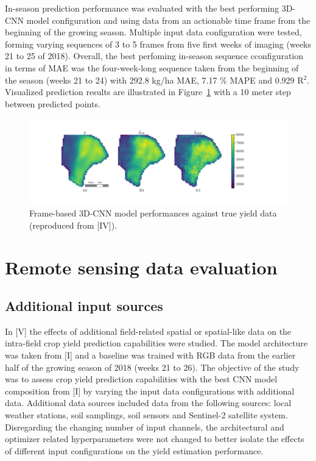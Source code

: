 In-season prediction performance was evaluated with the best performing 3D-CNN model configuration and using data from an actionable time frame from the beginning of the growing season. Multiple input data configuration were tested, forming varying sequences of 3 to 5 frames from five first weeks of imaging (weeks 21 to 25 of 2018). Overall, the best perfoming in-season sequence cconfiguration in terms of MAE was the four-week-long sequence taken from the beginning of the season (weeks 21 to 24) with 292.8 kg/ha MAE, 7.17 \% MAPE and 0.929 R$^2$. Visualized prediction results are illustrated in Figure~\ref{fig:iv-true-pred} with a 10 meter step between predicted points. 

\begin{figure}[htb]
    \centering
    \includegraphics[width = \textwidth]{Images/iv-true_pred.png}
    \caption{Frame-based 3D-CNN model performances against true yield data (reproduced from [IV]).}
    \label{fig:iv-true-pred}
\end{figure}

\section{Remote sensing data evaluation}
\label{sec:input-assessment-results}


\subsection{Additional input sources}
\label{subsec:additional-inputs-results}

In [V] the effects of additional field-related spatial or spatial-like data on the intra-field crop yield prediction capabilities were studied. The model architecture was taken from [I] and a baseline was trained with RGB data from the earlier half of the growing season of 2018 (weeks 21 to 26). The objective of the study was to assess crop yield prediction capabilities with the best CNN model composition from [I] by varying the input data configurations with additional data. Additional data sources included data from the following sources: local weather stations, soil samplings, soil sensors and Sentinel-2 satellite system. Disregarding the changing number of input channels, the architectural and optimizer related hyperparameters were not changed to better isolate the effects of different input configurations on the yield estimation performance.

